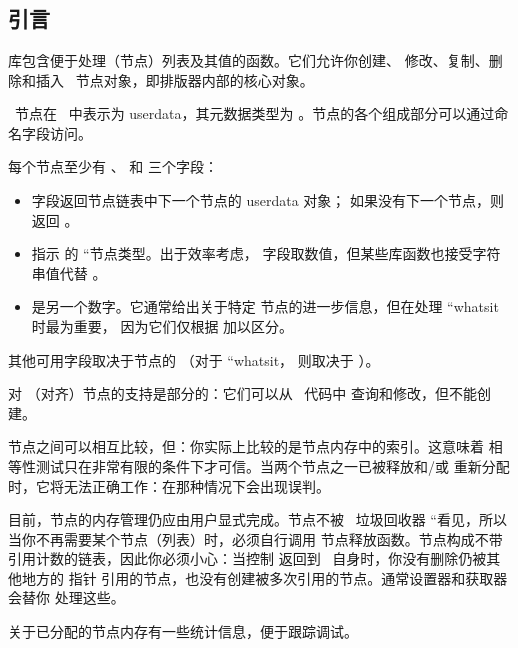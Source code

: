 \section{}

\subsection{引言}

 库包含便于处理（节点）列表及其值的函数。它们允许你创建、
修改、复制、删除和插入 \LUATEX\ 节点对象，即排版器内部的核心对象。

\LUATEX\ 节点在 \LUA\ 中表示为 userdata，其元数据类型为
。节点的各个组成部分可以通过命名字段访问。

每个节点至少有 、 和  三个字段：

\begin{itemize}

\item {} 字段返回节点链表中下一个节点的 userdata 对象；
    如果没有下一个节点，则返回 。

\item {} 指示 \TEX 的 ``节点类型。出于效率考虑，
     字段取数值，但某些库函数也接受字符串值代替 。

\item {} 是另一个数字。它通常给出关于特定 
    节点的进一步信息，但在处理 ``whatsit 时最为重要，
    因为它们仅根据  加以区分。

\end{itemize}

其他可用字段取决于节点的 （对于 ``whatsit，
则取决于 ）。

对 （对齐）节点的支持是部分的：它们可以从 \LUA\ 代码中
查询和修改，但不能创建。

节点之间可以相互比较，但：你实际上比较的是节点内存中的索引。这意味着
相等性测试只在非常有限的条件下才可信。当两个节点之一已被释放和/或
重新分配时，它将无法正确工作：在那种情况下会出现误判。

目前，节点的内存管理仍应由用户显式完成。节点不被 \LUA\ 垃圾回收器
``看见，所以当你不再需要某个节点（列表）时，必须自行调用
节点释放函数。节点构成不带引用计数的链表，因此你必须小心：当控制
返回到 \LUATEX\ 自身时，你没有删除仍被其他地方的  指针
引用的节点，也没有创建被多次引用的节点。通常设置器和获取器会替你
处理这些。

关于已分配的节点内存有一些统计信息，便于跟踪调试。

